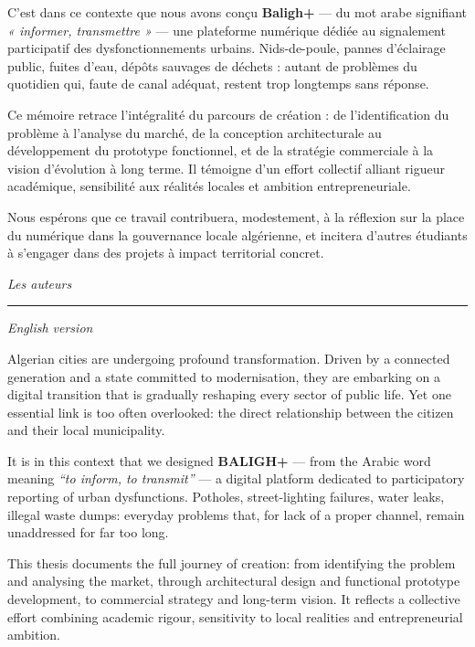 \documentclass[12pt,a4paper]{report}
\begin{document}
C'est dans ce contexte que nous avons conçu \textbf{Baligh+} — du mot arabe
\textit{} signifiant \textit{« informer, transmettre »} — une
plateforme numérique dédiée au signalement participatif des dysfonctionnements
urbains. Nids-de-poule, pannes d'éclairage public, fuites d'eau, dépôts
sauvages de déchets : autant de problèmes du quotidien qui, faute de canal
adéquat, restent trop longtemps sans réponse.

Ce mémoire retrace l'intégralité du parcours de création : de l'identification
du problème à l'analyse du marché, de la conception architecturale au
développement du prototype fonctionnel, et de la stratégie commerciale à la
vision d'évolution à long terme. Il témoigne d'un effort collectif alliant
rigueur académique, sensibilité aux réalités locales et ambition
entrepreneuriale.

Nous espérons que ce travail contribuera, modestement, à la réflexion sur la
place du numérique dans la gouvernance locale algérienne, et incitera d'autres
étudiants à s'engager dans des projets à impact territorial concret.

\vspace{0.8cm}
\begin{flushright}
  \textit{Les auteurs}
\end{flushright}

\vspace{0.6cm}
\textcolor{accent}{\rule{\linewidth}{0.6pt}}
\vspace{0.6cm}

{\small\textcolor{muted}{\textit{English version}}}
\vspace{0.4cm}

Algerian cities are undergoing profound transformation. Driven by a connected
generation and a state committed to modernisation, they are embarking on a
digital transition that is gradually reshaping every sector of public life. Yet
one essential link is too often overlooked: the direct relationship between the
citizen and their local municipality.

It is in this context that we designed \textbf{BALIGH+} — from the Arabic word
\textit{} meaning \textit{``to inform, to transmit''} — a digital
platform dedicated to participatory reporting of urban dysfunctions. Potholes,
street-lighting failures, water leaks, illegal waste dumps: everyday problems
that, for lack of a proper channel, remain unaddressed for far too long.

This thesis documents the full journey of creation: from identifying the
problem and analysing the market, through architectural design and functional
prototype development, to commercial strategy and long-term vision. It reflects
a collective effort combining academic rigour, sensitivity to local realities
and entrepreneurial ambition.
\end{document}
